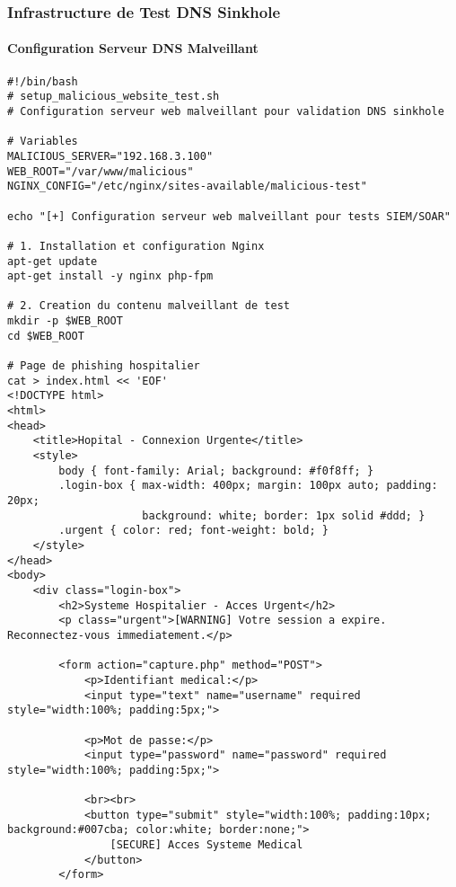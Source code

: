 \subsubsection{Infrastructure de Test DNS Sinkhole}

\paragraph{Configuration Serveur DNS Malveillant}
\begin{lstlisting}[style=bashstyle,caption=Configuration serveur web malveillant pour tests]
#!/bin/bash
# setup_malicious_website_test.sh
# Configuration serveur web malveillant pour validation DNS sinkhole

# Variables
MALICIOUS_SERVER="192.168.3.100"
WEB_ROOT="/var/www/malicious"
NGINX_CONFIG="/etc/nginx/sites-available/malicious-test"

echo "[+] Configuration serveur web malveillant pour tests SIEM/SOAR"

# 1. Installation et configuration Nginx
apt-get update
apt-get install -y nginx php-fpm

# 2. Creation du contenu malveillant de test
mkdir -p $WEB_ROOT
cd $WEB_ROOT

# Page de phishing hospitalier
cat > index.html << 'EOF'
<!DOCTYPE html>
<html>
<head>
    <title>Hopital - Connexion Urgente</title>
    <style>
        body { font-family: Arial; background: #f0f8ff; }
        .login-box { max-width: 400px; margin: 100px auto; padding: 20px; 
                     background: white; border: 1px solid #ddd; }
        .urgent { color: red; font-weight: bold; }
    </style>
</head>
<body>
    <div class="login-box">
        <h2>Systeme Hospitalier - Acces Urgent</h2>
        <p class="urgent">[WARNING] Votre session a expire. Reconnectez-vous immediatement.</p>
        
        <form action="capture.php" method="POST">
            <p>Identifiant medical:</p>
            <input type="text" name="username" required style="width:100%; padding:5px;">
            
            <p>Mot de passe:</p>
            <input type="password" name="password" required style="width:100%; padding:5px;">
            
            <br><br>
            <button type="submit" style="width:100%; padding:10px; background:#007cba; color:white; border:none;">
                [SECURE] Acces Systeme Medical
            </button>
        </form>
        

\end{lstlisting}
